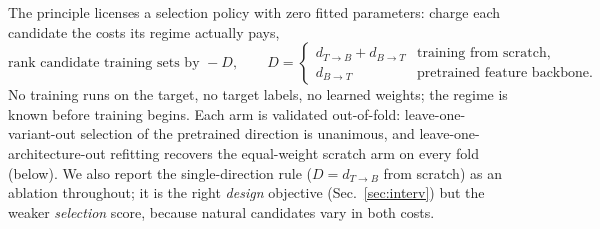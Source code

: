 \documentclass[runningheads]{llncs}
\newcommand{\dtb}{d_{T\to B}}
\newcommand{\dbt}{d_{B\to T}}
\begin{document}
The principle licenses a selection policy with zero fitted parameters:
charge each candidate the costs its regime actually pays,
\begin{equation}
\text{rank candidate training sets by } -D, \qquad
D =
\begin{cases}
\dtb + \dbt & \text{training from scratch,}\\[2pt]
\dbt & \text{pretrained feature backbone.}
\end{cases}
\label{eq:rule}
\end{equation}
No training runs on the target, no target labels, no learned weights; the
regime is known before training begins. Each arm is validated out-of-fold:
leave-one-variant-out selection of the pretrained direction is unanimous,
and leave-one-architecture-out refitting recovers the equal-weight scratch
arm on every fold (below). We also report the single-direction rule
($D{=}\dtb$ from scratch) as an ablation throughout; it is the right
\emph{design} objective (Sec.~\ref{sec:interv}) but the weaker
\emph{selection} score, because natural candidates vary in both costs.

\begin{table}[t]
\centering
\caption{\textbf{Within-context ranking, all predictor families, pooled over
the nine variants} (within-context Spearman $\rho$; 95\% bootstrap CIs in
supp.). The regime-aware policy of Eq.~(\ref{eq:rule}) is best on every
protocol, and its margins decompose exactly as the two-cost reading says
they should: it beats summed-distance-everywhere because under a backbone it drops
the forgiven cost ($+0.61$ vs.\ $+0.39$ in the pretrained regime), and it
beats matched-direction-everywhere because from scratch both costs are real
($+0.50$ vs.\ $+0.42$ in the scratch regime). Each fixed single direction
collapses on the regime whose cost structure it mismatches; the learned
ridge, fit across regimes, is diluted by the sign flip; appearance carries
no within-context signal.}
\label{tab:predictors}
\small
\setlength{\tabcolsep}{4.5pt}

\end{table}
\end{document}
